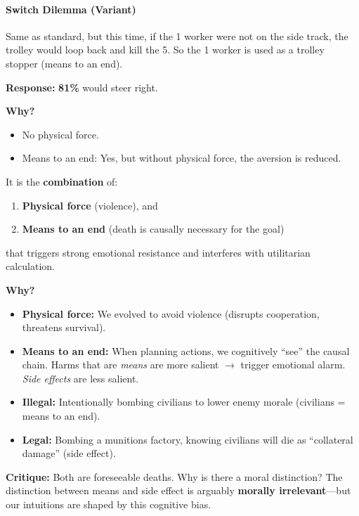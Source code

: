\separator

\paragraph*{Switch Dilemma (Variant)}

Same as standard, but this time, if the 1 worker were not on the side track, the trolley would loop back and kill the 5. So the 1 worker is used as a trolley stopper (means to an end).

\textbf{Response:} \textbf{81\%} would steer right.

\textbf{Why?}
\begin{itemize}
  \item No physical force.
  \item Means to an end: Yes, but without physical force, the aversion is reduced.
\end{itemize}

\separator

\begin{thmbox}
It is the \textbf{combination} of:
\begin{enumerate}
  \item \textbf{Physical force} (violence), and
  \item \textbf{Means to an end} (death is causally necessary for the goal)
\end{enumerate}
that triggers strong emotional resistance and interferes with utilitarian calculation.

\textbf{Why?}
\begin{itemize}
  \item \textbf{Physical force:} We evolved to avoid violence (disrupts cooperation, threatens survival).
  \item \textbf{Means to an end:} When planning actions, we cognitively ``see'' the causal chain. Harms that are \textit{means} are more salient $\to$ trigger emotional alarm. \textit{Side effects} are less salient.
\end{itemize}
\end{thmbox}

\begin{exbox}
\begin{itemize}
  \item \textbf{Illegal:} Intentionally bombing civilians to lower enemy morale (civilians = means to an end).
  \item \textbf{Legal:} Bombing a munitions factory, knowing civilians will die as ``collateral damage'' (side effect).
\end{itemize}

\textbf{Critique:} Both are foreseeable deaths. Why is there a moral distinction? The distinction between means and side effect is arguably \textbf{morally irrelevant}---but our intuitions are shaped by this cognitive bias.
\end{exbox}

